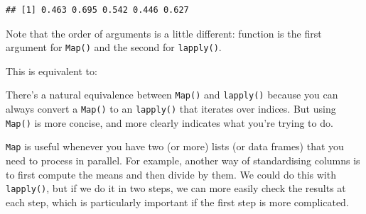 \begin{Shaded}
\begin{Highlighting}[]
\NormalTok{(}
\end{Highlighting}
\end{Shaded}

\begin{verbatim}
## [1] 0.463 0.695 0.542 0.446 0.627
\end{verbatim}

Note that the order of arguments is a little different: function is the
first argument for \texttt{Map()} and the second for \texttt{lapply()}.

This is equivalent to:

\begin{Shaded}
\begin{Highlighting}[]
\NormalTok{(}\OperatorTok{==}\StringTok{ }
\StringTok{ }\NormalTok{(}\NormalTok{, }
 
\StringTok{ }
\NormalTok{\}}
\end{Highlighting}
\end{Shaded}

There's a natural equivalence between \texttt{Map()} and
\texttt{lapply()} because you can always convert a \texttt{Map()} to an
\texttt{lapply()} that iterates over indices. But using \texttt{Map()}
is more concise, and more clearly indicates what you're trying to do.

\texttt{Map} is useful whenever you have two (or more) lists (or data
frames) that you need to process in parallel. For example, another way
of standardising columns is to first compute the means and then divide
by them. We could do this with \texttt{lapply()}, but if we do it in two
steps, we can more easily check the results at each step, which is
particularly important if the first step is more complicated.

\begin{Shaded}
\begin{Highlighting}[]
\StringTok{ }
\StringTok{ }\NormalTok{(}\DataTypeTok{/}

\StringTok{ }\OperatorTok{/}\StringTok{ }
\end{Highlighting}
\end{Shaded}

